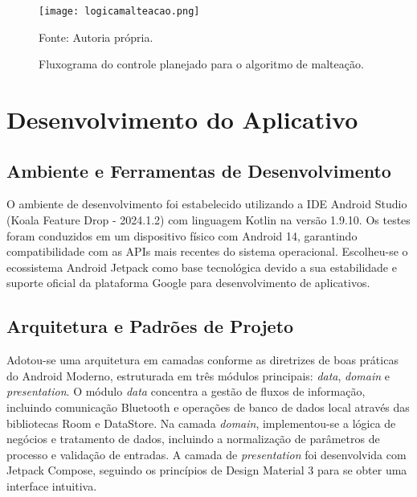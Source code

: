 \begin{figure}[ht]
    \centering
    \caption{Fluxograma do controle planejado para o algoritmo de malteação.}
    \label{fig:logicamalteacao}
    \texttt{[image: logicamalteacao.png]}

    {\centering\footnotesize Fonte: Autoria própria.\par}
\end{figure}





\section{Desenvolvimento do Aplicativo}
\subsection{Ambiente e Ferramentas de Desenvolvimento}

O ambiente de desenvolvimento foi estabelecido utilizando a IDE Android Studio (Koala Feature Drop - 2024.1.2) com linguagem Kotlin na versão 1.9.10. Os testes foram conduzidos em um dispositivo físico com Android 14, garantindo compatibilidade com as APIs mais recentes do sistema operacional. Escolheu-se o ecossistema Android Jetpack como base tecnológica devido a sua estabilidade e suporte oficial da plataforma Google para desenvolvimento de aplicativos.

\subsection{Arquitetura e Padrões de Projeto}

Adotou-se uma arquitetura em camadas conforme as diretrizes de boas práticas do Android Moderno, estruturada em três módulos principais: \textit{data}, \textit{domain} e \textit{presentation}. O módulo \textit{data} concentra a gestão de fluxos de informação, incluindo comunicação Bluetooth e operações de banco de dados local através das bibliotecas Room e DataStore. Na camada \textit{domain}, implementou-se a lógica de negócios e tratamento de dados, incluindo a normalização de parâmetros de processo e validação de entradas. A camada de \textit{presentation} foi desenvolvida com Jetpack Compose, seguindo os princípios de Design Material 3 para se obter uma interface intuitiva.

